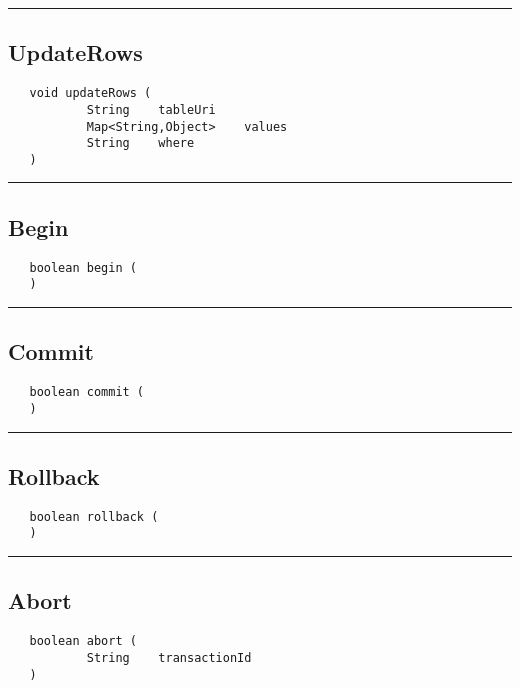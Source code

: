 \rule{15cm}{2pt}
\subsection{UpdateRows}
\label{Api:UpdateRows}
\begin{verbatim}
   void updateRows (
           String    tableUri
           Map<String,Object>    values
           String    where
   )
\end{verbatim}



\rule{15cm}{2pt}
\subsection{Begin}
\label{Api:Begin}
\begin{verbatim}
   boolean begin (
   )
\end{verbatim}



\rule{15cm}{2pt}
\subsection{Commit}
\label{Api:Commit}
\begin{verbatim}
   boolean commit (
   )
\end{verbatim}



\rule{15cm}{2pt}
\subsection{Rollback}
\label{Api:Rollback}
\begin{verbatim}
   boolean rollback (
   )
\end{verbatim}



\rule{15cm}{2pt}
\subsection{Abort}
\label{Api:Abort}
\begin{verbatim}
   boolean abort (
           String    transactionId
   )
\end{verbatim}



